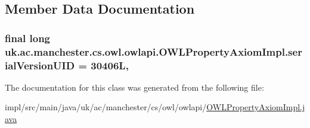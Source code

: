 \subsection{Member Data Documentation}
\hypertarget{classuk_1_1ac_1_1manchester_1_1cs_1_1owl_1_1owlapi_1_1_o_w_l_property_axiom_impl_a389151a1ddc73e44572459ea81e7614e}{
\subsubsection[{serial\-Version\-U\-I\-D}]{\setlength{\rightskip}{0pt plus 5cm}final long uk.\-ac.\-manchester.\-cs.\-owl.\-owlapi.\-O\-W\-L\-Property\-Axiom\-Impl.\-serial\-Version\-U\-I\-D = 30406\-L\hspace{0.3cm}{\ttfamily [static]}, {\ttfamily [private]}}}\label{classuk_1_1ac_1_1manchester_1_1cs_1_1owl_1_1owlapi_1_1_o_w_l_property_axiom_impl_a389151a1ddc73e44572459ea81e7614e}


The documentation for this class was generated from the following file\-:\begin{DoxyCompactItemize}
\item 
impl/src/main/java/uk/ac/manchester/cs/owl/owlapi/\hyperlink{_o_w_l_property_axiom_impl_8java}{O\-W\-L\-Property\-Axiom\-Impl.\-java}\end{DoxyCompactItemize}
